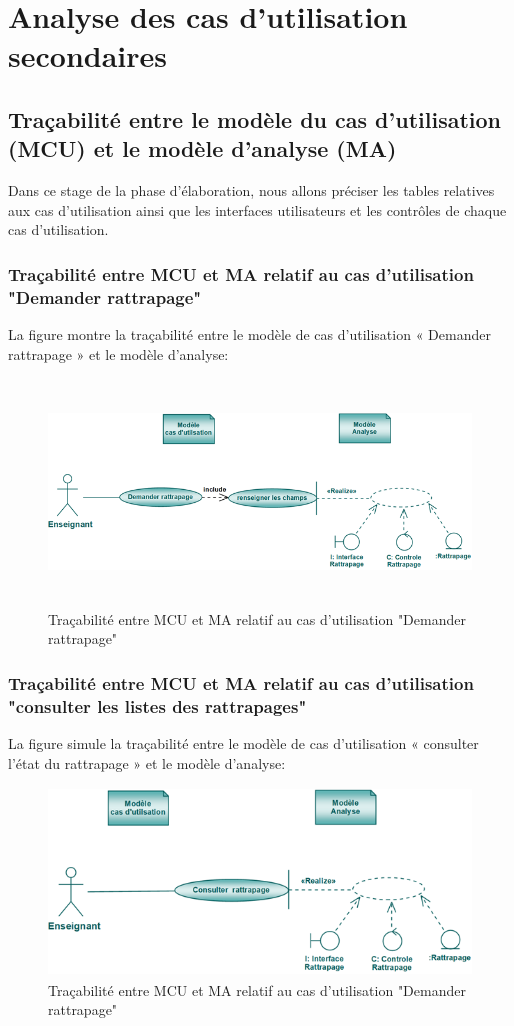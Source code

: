 \documentclass[12 pt ]{report}
\begin{document}
\section{Analyse des cas d’utilisation secondaires }
\subsection{Traçabilité entre le modèle du cas d’utilisation (MCU) et le modèle d’analyse (MA)}
Dans ce stage de la phase d'élaboration, nous allons préciser les tables relatives aux cas d’utilisation ainsi que les interfaces utilisateurs et les contrôles de chaque cas d’utilisation.
\subsubsection{Traçabilité entre MCU et MA relatif au cas d’utilisation "Demander rattrapage" }
La figure  montre la traçabilité entre le modèle de cas d’utilisation « Demander rattrapage » et le modèle d’analyse:
\begin{figure}[h]
\begin{center}
\includegraphics[width= 13cm , height =6cm]{tdr.PNG}
\caption{Traçabilité entre MCU et MA relatif au cas d’utilisation "Demander rattrapage"}
\end{center}
\end{figure} 
\newpage
\subsubsection{Traçabilité entre MCU et MA relatif au cas d’utilisation "consulter les listes des rattrapages" }
La figure  simule la traçabilité entre le modèle de cas d’utilisation « consulter l'état du rattrapage » et le modèle d’analyse:
\begin{figure}[h]
\begin{center}
\includegraphics[width= 12cm , height =5cm]{tcr.PNG}
\caption{Traçabilité entre MCU et MA relatif au cas d’utilisation "Demander rattrapage"}
\end{center}
\end{figure} 
\end{document}
